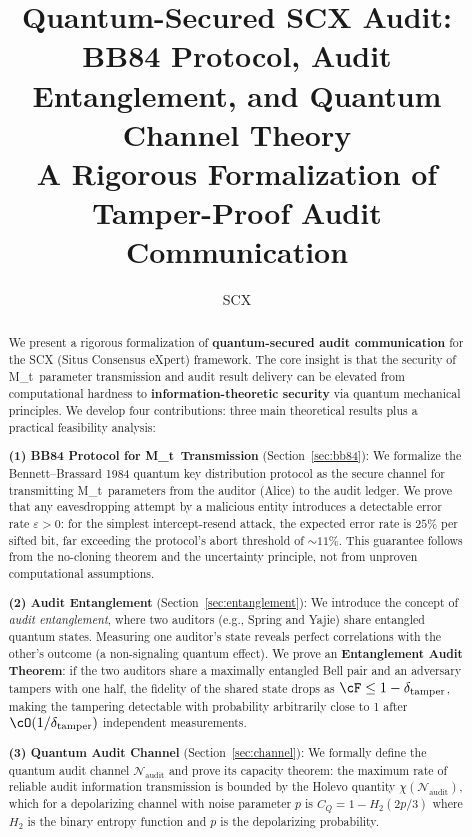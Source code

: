 \documentclass[11pt,a4paper]{article}
\title{
  {\large\textbf{Quantum-Secured SCX Audit:}}\\[4pt]
  {\large\textbf{BB84 Protocol, Audit Entanglement, and Quantum Channel Theory}}\\[8pt]
  {\footnotesize A Rigorous Formalization of Tamper-Proof Audit Communication}
}
\author{SCX}
\date{}
\theoremstyle{plain}
\theoremstyle{definition}
\theoremstyle{remark}
\newcommand{\cN}{\mathcal{N}}
\newcommand{\Mt}{M_t}
\begin{document}
\maketitle

\begin{abstract}
\noindent
We present a rigorous formalization of \textbf{quantum-secured audit communication}
for the SCX (Situs Consensus eXpert) framework. The core insight is that the
security of \Mt\ parameter transmission and audit result delivery can be
elevated from computational hardness to \textbf{information-theoretic security}
via quantum mechanical principles. We develop four contributions:
three main theoretical results plus a practical feasibility analysis:

\textbf{(1) BB84 Protocol for \Mt\ Transmission} (Section~\ref{sec:bb84}): We
formalize the Bennett--Brassard 1984 quantum key distribution protocol as the
secure channel for transmitting \Mt\ parameters from the auditor (Alice) to the
audit ledger. We prove that any eavesdropping attempt by a malicious entity
introduces a detectable error rate $\varepsilon > 0$: for the simplest
intercept-resend attack, the expected error rate is $25\%$ per sifted bit,
far exceeding the protocol's abort threshold of $\sim\!11\%$. This guarantee
follows from the no-cloning theorem and the uncertainty principle, not from
unproven computational assumptions.

\textbf{(2) Audit Entanglement} (Section~\ref{sec:entanglement}): We introduce
the concept of \emph{audit entanglement}, where two auditors (e.g., Spring and
Yajie) share entangled quantum states. Measuring one auditor's state
reveals perfect correlations with the other's outcome (a non-signaling
quantum effect). We prove an \textbf{Entanglement Audit Theorem}:
if the two auditors share a maximally entangled Bell pair and an adversary
tampers with one half, the fidelity of the shared state drops as
$\cF \leq 1 - \delta_{\text{tamper}}$, making the tampering detectable with
probability arbitrarily close to 1 after $\cO(1/\delta_{\text{tamper}})$
independent measurements.

\textbf{(3) Quantum Audit Channel} (Section~\ref{sec:channel}): We formally
define the quantum audit channel $\cN_{\text{audit}}$ and prove its capacity
theorem: the maximum rate of reliable audit information transmission is bounded
by the Holevo quantity $\chi(\cN_{\text{audit}})$, which for a depolarizing
channel with noise parameter $p$ is
$C_Q = 1 - H_2(2p/3)$
where $H_2$ is the binary entropy function and $p$ is the depolarizing
probability.


\end{abstract}
\end{document}
